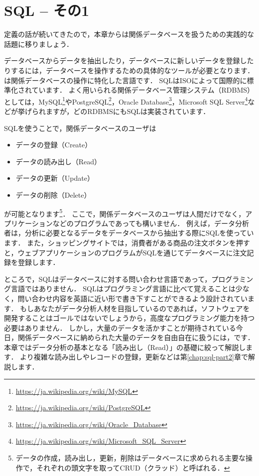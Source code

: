 \chapter{SQL -- その1}\label{chap:sql-part1}
定義の話が続いてきたので，本章からは関係データベースを扱うための実践的な話題に移りましょう．

データベースからデータを抽出したり，データベースに新しいデータを登録したりするには，データベースを操作するための具体的なツールが必要となります．
 は関係データベースの操作に特化した言語です．
SQLはISOによって国際的に標準化されています．
よく用いられる関係データベース管理システム（RDBMS）としては，MySQL\footnote{\url{https://ja.wikipedia.org/wiki/MySQL}}やPostgreSQL\footnote{\url{https://ja.wikipedia.org/wiki/PostgreSQL}}，Oracle Database\footnote{\url{https://ja.wikipedia.org/wiki/Oracle_Database}}，Microsoft SQL Server\footnote{\url{https://ja.wikipedia.org/wiki/Microsoft_SQL_Server}}などが挙げられますが，どのRDBMSにもSQLは実装されています．

SQLを使うことで，関係データベースのユーザは
\begin{itemize}
\item データの登録（Create）
\item データの読み出し（Read）
\item データの更新（Update）
\item データの削除（Delete）
\end{itemize}
が可能となります\footnote{データの作成，読み出し，更新，削除はデータベースに求められる主要な操作で，それぞれの頭文字を取ってCRUD（クラッド）と呼ばれる．}．
ここで，関係データベースのユーザは人間だけでなく，アプリケーションなどのプログラムであっても構いません．
例えば，データ分析者は，分析に必要となるデータをデータベースから抽出する際にSQLを使っています．
また，ショッピングサイトでは，消費者がある商品の注文ボタンを押すと，ウェブアプリケーションのプログラムがSQLを通じてデータベースに注文記録を登録します．

ところで，SQLはデータベースに対する問い合わせ言語であって，プログラミング言語ではありません．
SQLはプログラミング言語に比べて覚えることは少なく，問い合わせ内容を英語に近い形で書き下すことができるよう設計されています．
もしあなたがデータ分析人材を目指しているのであれば，ソフトウェアを開発することはゴールではないでしょうから，高度なプログラミング能力を持つ必要はありません．
しかし，大量のデータを活かすことが期待されている今日，関係データベースに納められた大量のデータを自由自在に扱うには，です．
本章ではデータ分析の基本となる「読み出し（Read）」の基礎に絞って解説します．
より複雑な読み出しやレコードの登録，更新などは第\ref{chap:sql-part2}章で解説します．


